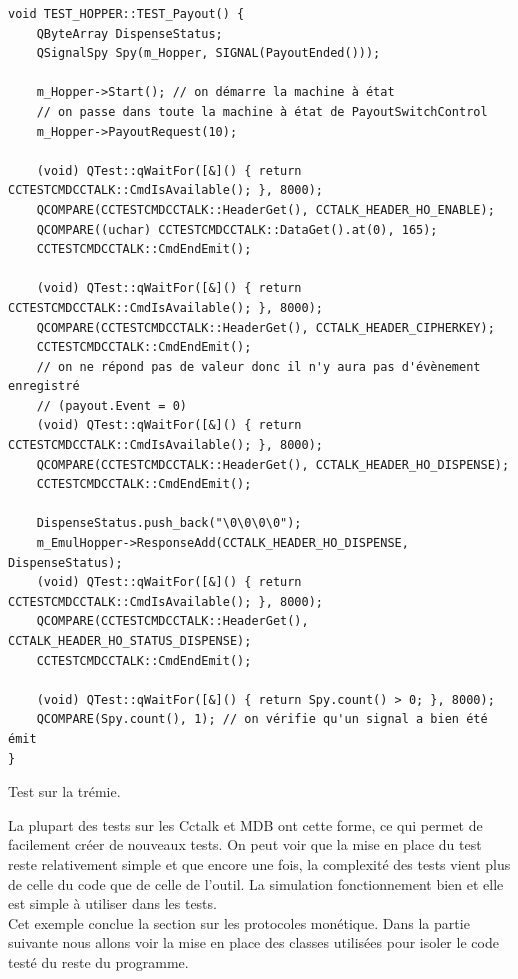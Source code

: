 \documentclass[a4paper]{article}
\begin{document}
\begin{listing}[ht!]
\begin{verbatim}
void TEST_HOPPER::TEST_Payout() {
    QByteArray DispenseStatus;
    QSignalSpy Spy(m_Hopper, SIGNAL(PayoutEnded()));

    m_Hopper->Start(); // on démarre la machine à état
    // on passe dans toute la machine à état de PayoutSwitchControl
    m_Hopper->PayoutRequest(10);

    (void) QTest::qWaitFor([&]() { return CCTESTCMDCCTALK::CmdIsAvailable(); }, 8000);
    QCOMPARE(CCTESTCMDCCTALK::HeaderGet(), CCTALK_HEADER_HO_ENABLE);
    QCOMPARE((uchar) CCTESTCMDCCTALK::DataGet().at(0), 165);
    CCTESTCMDCCTALK::CmdEndEmit();

    (void) QTest::qWaitFor([&]() { return CCTESTCMDCCTALK::CmdIsAvailable(); }, 8000);
    QCOMPARE(CCTESTCMDCCTALK::HeaderGet(), CCTALK_HEADER_CIPHERKEY);
    CCTESTCMDCCTALK::CmdEndEmit();
    // on ne répond pas de valeur donc il n'y aura pas d'évènement enregistré
    // (payout.Event = 0)
    (void) QTest::qWaitFor([&]() { return CCTESTCMDCCTALK::CmdIsAvailable(); }, 8000);
    QCOMPARE(CCTESTCMDCCTALK::HeaderGet(), CCTALK_HEADER_HO_DISPENSE);
    CCTESTCMDCCTALK::CmdEndEmit();

    DispenseStatus.push_back("\0\0\0\0");
    m_EmulHopper->ResponseAdd(CCTALK_HEADER_HO_DISPENSE, DispenseStatus);
    (void) QTest::qWaitFor([&]() { return CCTESTCMDCCTALK::CmdIsAvailable(); }, 8000);
    QCOMPARE(CCTESTCMDCCTALK::HeaderGet(), CCTALK_HEADER_HO_STATUS_DISPENSE);
    CCTESTCMDCCTALK::CmdEndEmit();

    (void) QTest::qWaitFor([&]() { return Spy.count() > 0; }, 8000);
    QCOMPARE(Spy.count(), 1); // on vérifie qu'un signal a bien été émit
}
\end{verbatim}
\caption{Test sur la trémie.}
\label{testhopper}
\end{listing}
\pagebreak

La plupart des tests sur les Cctalk et MDB ont cette forme, ce qui permet de
facilement créer de nouveaux tests. On peut voir que la mise en place du test
reste relativement simple et que encore une fois, la complexité des tests vient
plus de celle du code que de celle de l'outil. La simulation fonctionnement bien
et elle est simple à utiliser dans les tests.\\

Cet exemple conclue la section sur les protocoles monétique. Dans la partie
suivante nous allons voir la mise en place des classes utilisées pour isoler le
code testé du reste du programme.
\end{document}
